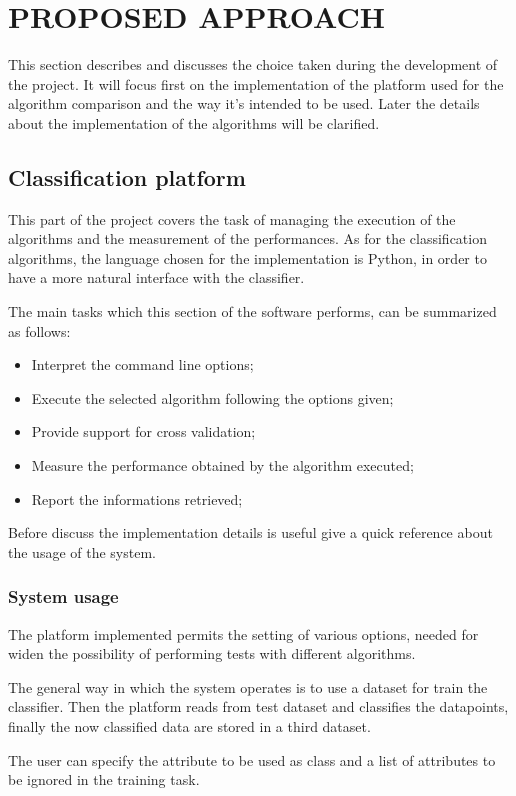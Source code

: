 \documentclass{acm_proc_article-sp-sigmod07}
\begin{document}
\section{PROPOSED APPROACH}
This section describes and discusses the choice taken during the
development of the project. It will focus first on the implementation of
the platform used for the algorithm comparison and the way it's intended
to be used.
Later the details about the implementation of the algorithms will be
clarified.

\subsection{Classification platform}
This part of the project covers the task of managing the execution of the
algorithms and the measurement of the performances. As for the
classification algorithms, the language chosen for the implementation is
Python, in order to have a more natural interface with the classifier.

The main tasks which this section of the software performs, can be
summarized as follows:
\begin{itemize}
\item Interpret the command line options;
\item Execute the selected algorithm following the options given;
\item Provide support for cross validation;
\item Measure the performance obtained by the algorithm executed;
\item Report the informations retrieved;
\end{itemize}

Before discuss the implementation details is useful give a quick reference
about the usage of the system.

\subsubsection{System usage}
The platform implemented permits the setting of various options, needed
for widen the possibility of performing tests with different algorithms.

The general way in which the system operates is to use a dataset for train
the classifier. Then the platform reads from test dataset and classifies
the datapoints, finally the now classified data are stored in a third
dataset.

The user can specify the attribute to be used as class and a list of
attributes to be ignored in the training task.
\end{document}
